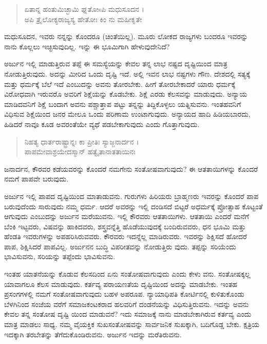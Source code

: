 \begin{verse}
ಏತಾನ್ನ ಹಂತುಮಿಚ್ಛಾಮಿ ಘ್ನತೋsಪಿ ಮಧುಸೂದನ ।\\ಅಪಿ ತ್ರೈಲೋಕ್ಯರಾಜ್ಯಸ್ಯ ಹೇತೋಃ ಕಿಂ ನು ಮಹೀಕೃತೇ 
\end{verse}

{\small ಮಧುಸೂದನ, ಇವರು ನನ್ನನ್ನು ಕೊಂದರೂ (ಚಿಂತೆಯಿಲ್ಲ). ಮೂರು ಲೋಕದ ರಾಜ್ಯಗಳು ಬಂದರೂ ಇವರನ್ನು ನಾನು ಕೊಲ್ಲಲು ಇಚ್ಛಿಸುವುದಿಲ್ಲ. ಇನ್ನು ಈ ಭೂಮಿಗಾಗಿ ಹೇಳುವುದೇನಿದೆ?}

ಅರ್ಜುನ ಇಲ್ಲಿ ಮಾಡುತ್ತಿರುವ ತಪ್ಪೆ ಈ ಸಮಸ್ಯೆಯನ್ನು ಕೇವಲ ತನ್ನ ಲಾಭ ನಷ್ಟದ ದೃಷ್ಟಿಯಿಂದ ಮಾತ್ರ ನೋಡುತ್ತಿರುವುದು. ಅದನ್ನು ಮೀರಿದ ಒಂದು ದೃಷ್ಟಿ ಇದೆ. ಅಲ್ಲಿ ಇವನ ಲಾಭ ನಷ್ಟಗಳು ಗೌಣ. ದೇಶದಲ್ಲಿ ಸತ್ಯಕ್ಕೆ ಮತ್ತು ಧರ್ಮಕ್ಕೆ ಬೆಲೆ ಇದೆ ಎಂಬುದನ್ನು ಅವನು ತೋರಬೇಕು. ಹೀಗೆ ತೋರಬೇಕಾದರೆ ಯಾರು ಧರ್ಮಕ್ಕೆ ವಿರೋಧವಾಗಿ ಇರುವರೊ ಅವರಿಗೆ ಶಿಕ್ಷೆಯನ್ನು ಕೊಡಬೇಕು. ಶಿಕ್ಷೆ ಎರಡು ಕೆಲಸವನ್ನು ಮಾಡುವುದು. ಅನ್ಯಾಯ ಮಾಡಿದವನಿಗೆ ಶಿಕ್ಷೆ ಬಂದಾಗ ಅವನು ಪಶ್ಚಾತ್ತಾಪ ಪಟ್ಟು ತನ್ನನ್ನು ತಿದ್ದಿಕೊಳ್ಳಲು ಯತ್ನಿಸುವನು. ಇಂತಹವನಿಗೆ ವಿಧಿಸುವ ಶಿಕ್ಷೆಯಿಂದ ಜನರ ಮೇಲೂ ಒಂದು ಪರಿಣಾಮ ಉಂಟಾಗುವುದು. ಅನ್ಯಾಯದ ಹಾದಿ ಹಿಡಿಯಬಾರದು, ಹಿಡಿದರೆ ನಾವೂ ಕೂಡ ಅವರಂತೆಯೇ ವ್ಯಥೆ ಪಡಬೇಕಾಗುವುದು ಎಂದು ಗೊತ್ತಾಗುವುದು.

\begin{verse}
ನಿಹತ್ಯ ಧಾರ್ತರಾಷ್ಟ್ರಾನ್ನಃ ಕಾ ಪ್ರೀತಿಃ ಸ್ಯಾಜ್ಜನಾರ್ದನ ।\\ಪಾಪಮೇವಾಶ್ರಯೇದಸ್ಮಾನ್ ಹತ್ವೈತಾನಾತತಾಯಿನಃ 
\end{verse}

{\small ಜನಾರ್ದನ, ಕೌರವರ ಕಡೆಯವರನ್ನು ಕೊಂದರೆ ನಮಗೇನು ಸಂತೋಷವಾಗುವುದು? ಈ ಆತತಾಯಿಗಳನ್ನು ಕೊಂದರೆ ನಮಗೆ ಪಾಪವೇ ಬರುವುದು.}

ಅರ್ಜುನ ಇಲ್ಲಿ ಪಾಪದ ದೃಷ್ಟಿಯಿಂದ ಮಾತಾಡುವನು. ಗುರುಗಳು ಹಿರಿಯರು ಬ್ರಾಹ್ಮಣರು ಇವರನ್ನು ಕೊಂದರೆ ಪಾಪ ಬರುವುದೆಂದು ಸಾರುವುದು ನಮ್ಮ ಧರ್ಮ. ಆದರೆ ಅವರನ್ನು ಇಲ್ಲಿ ದಂಡಿಸದೆ ಬಿಟ್ಟರೆ ಅಧರ್ಮಕ್ಕೆ ಪ್ರೋತ್ಸಾಹ ಕೊಟ್ಟಂತೆ ಆಗುವುದು ಎಂಬುದನ್ನು ಅರ್ಜುನ ಮರೆಯುವನು. ಇಲ್ಲಿ ಕೌರವರು ಆತತಾಯಿಗಳು. ಆತತಾಯಿ ಎಂದರೆ ಮನೆಗೆ ಬೆಂಕಿ ಇಟ್ಟವರು, ವಿಷವನ್ನು ಹಾಕಿದವರು, ಶಸ್ತ್ರವನ್ನೆತ್ತಿ ಹೊಡೆಯುವುದಕ್ಕೆ ಬಂದಿರುವವರು, ಧನ ಭೂಮಿ ಮತ್ತು ಹೆಂಡತಿ ಇವರುಗಳನ್ನು ಅಪಹರಿಸಿರುವವರು. ಕೌರವರು ಇದನ್ನೆಲ್ಲ ಮಾಡಿರುವರು. ಇವರನ್ನು ಶಿಕ್ಷಿಸದೆ ಹೋದರೆ ಪಾಪ, ಶಿಕ್ಷಿಸಿದರೆ ಪಾಪವಿಲ್ಲ. ಅರ್ಜುನನ ಬುದ್ಧಿ ವಿಪರೀತವನ್ನು ನೋಡುತ್ತಿರು ವುದು. ತಪ್ಪನ್ನು ಸರಿಯೆಂದು ಭಾವಿಸುವನು, ಸರಿಯನ್ನು ತಪ್ಪೆಂದು ಭಾವಿಸುವನು.

ಇಂತಹ ಯಾತನೆಯನ್ನು ಕೊಡುವ ಕೆಲಸದಿಂದ ಏನು ಸಂತೋಷವಾಗುವುದು ಎಂದು ಕೇಳು ವನು. ಸಂತೋಷಕ್ಕಲ್ಲ ಯಾವಾಗಲೂ ಕೆಲಸ ಮಾಡುವುದು. ಕರ್ತವ್ಯ ಪರಾಯಣತೆಯ ದೃಷ್ಟಿಯಿಂದ ಅದನ್ನು ಮಾಡಬೇಕು. ಇಂತಹ ಪ್ರಸಂಗಗಳಲ್ಲಿ ನಮಗೆ ಸಂತೋಷವಾಗುವುದು ಬಹಳ ಅಪರೂಪ. ನ್ಯಾಯಾಧಿಪತಿ ಕೋರ್ಟಿನಲ್ಲಿ ಕುಳಿತುಕೊಂಡು ಬೆಳಗಿನಿಂದ ಸಂಜೆಯ ವರೆಗೆ ಸಮಾಜಕಂಟಕರಾದ ಹಲವರಿಗೆ ದಂಡನೆಯನ್ನು ವಿಧಿಸುತ್ತಿರುವನು. ಇದನ್ನು ಅವನು ಕೇವಲ ತನ್ನ ಸಂತೋಷ ದೃಷ್ಟಿ ಯಿಂದ ಮಾಡುವನೆ? ಇದು ಸಮಾಜಕ್ಕೆ ನಾನು ಮಾಡಬೇಕಾಗಿರುವ ಕರ್ತವ್ಯ ಎಂದು ಮಾತ್ರ ಮಾಡಲು ಸಾಧ್ಯ. ನಮ್ಮ ವೈಯಕ್ತಿಕ ಸುಖಸಂತೋಷವನ್ನು ಸಾರ್ವಜನಿಕ ಸುಖಕ್ಕಾಗಿ, ಬದಿಗೊಡ್ಡ ಬೇಕು. ಕ್ಷತ್ರಿಯ ಇದಕ್ಕಾಗಿ ತರಬೇತನ್ನು ತೆಗೆದುಕೊಂಡಿರುವನು. ಅರ್ಜುನ ಇದನ್ನು ಮರೆತಿರುವನು.

